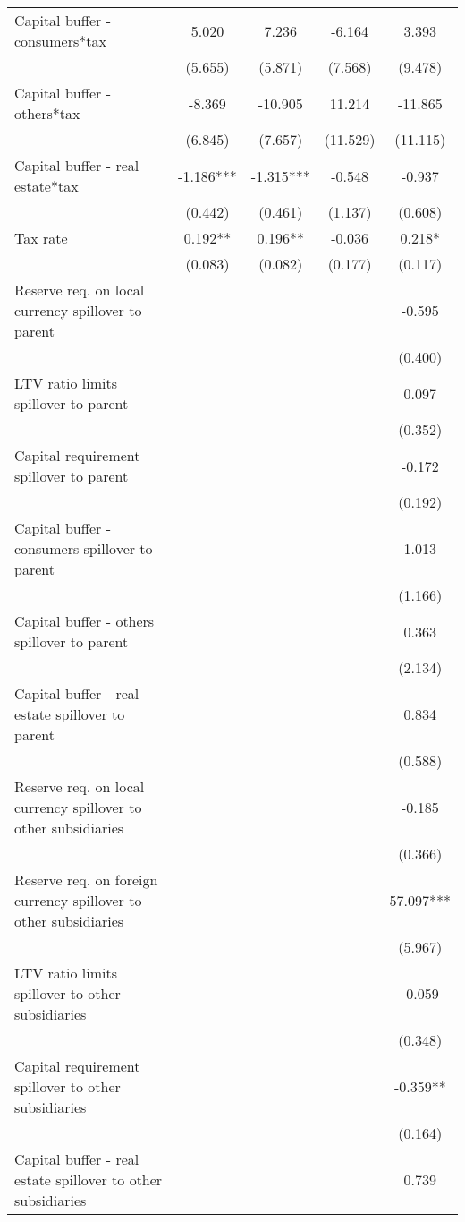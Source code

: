 \begin{tabular}{lcccc}
Capital buffer - consumers*tax & 5.020 & 7.236 & -6.164 & 3.393 \\
 & (5.655) & (5.871) & (7.568) & (9.478) \\
Capital buffer - others*tax & -8.369 & -10.905 & 11.214 & -11.865 \\
 & (6.845) & (7.657) & (11.529) & (11.115) \\
Capital buffer - real estate*tax & -1.186*** & -1.315*** & -0.548 & -0.937 \\
 & (0.442) & (0.461) & (1.137) & (0.608) \\
Tax rate & 0.192** & 0.196** & -0.036 & 0.218* \\
 & (0.083) & (0.082) & (0.177) & (0.117) \\
Reserve req. on local currency spillover to parent &  &  &  & -0.595 \\
 &  &  &  & (0.400) \\
LTV ratio limits spillover to parent &  &  &  & 0.097 \\
 &  &  &  & (0.352) \\
Capital requirement spillover to parent &  &  &  & -0.172 \\
 &  &  &  & (0.192) \\
Capital buffer - consumers spillover to parent &  &  &  & 1.013 \\
 &  &  &  & (1.166) \\
Capital buffer - others spillover to parent &  &  &  & 0.363 \\
 &  &  &  & (2.134) \\
Capital buffer - real estate spillover to parent &  &  &  & 0.834 \\
 &  &  &  & (0.588) \\
Reserve req. on local currency spillover to other subsidiaries &  &  &  & -0.185 \\
 &  &  &  & (0.366) \\
Reserve req. on foreign currency spillover to other subsidiaries &  &  &  & 57.097*** \\
 &  &  &  & (5.967) \\
LTV ratio limits spillover to other subsidiaries &  &  &  & -0.059 \\
 &  &  &  & (0.348) \\
Capital requirement spillover to other subsidiaries &  &  &  & -0.359** \\
 &  &  &  & (0.164) \\
Capital buffer - real estate spillover to other subsidiaries &  &  &  & 0.739 \\

\end{tabular}
